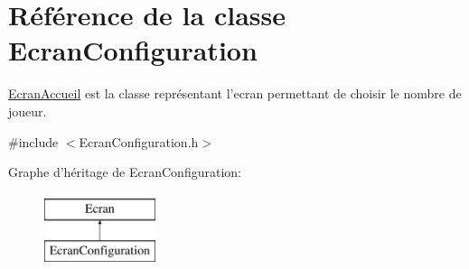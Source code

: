 \hypertarget{classEcranConfiguration}{\section{\-Référence de la classe \-Ecran\-Configuration}
\label{classEcranConfiguration}
}


\hyperlink{classEcranAccueil}{\-Ecran\-Accueil} est la classe représentant l'ecran permettant de choisir le nombre de joueur.  




{\ttfamily \#include $<$\-Ecran\-Configuration.\-h$>$}

\-Graphe d'héritage de \-Ecran\-Configuration\-:\begin{figure}[H]
\begin{center}
\leavevmode
\includegraphics[height=2.000000cm]{classEcranConfiguration}
\end{center}
\end{figure}
